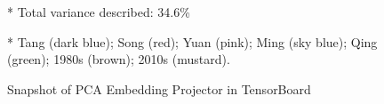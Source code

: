 \begin{figure}[H]
\begin{threeparttable}
\begin{minipage}[b]{0.45\linewidth}
  \end{minipage}
    \begin{tablenotes}
      \linespread{1}\footnotesize
      \item[*]\hspace*{-\fontdimen2\font}Total variance described: 34.6\%
      \item[*]\hspace*{-\fontdimen2\font}Tang (dark blue); Song (red); Yuan (pink); Ming (sky blue); Qing (green); 1980s (brown); 2010s (mustard).
    \end{tablenotes}
  \end{threeparttable}
  \caption{Snapshot of PCA Embedding Projector in TensorBoard} \label{fig:tensorboard_PCA}
\end{figure}

\vspace*{\baselineskip}
